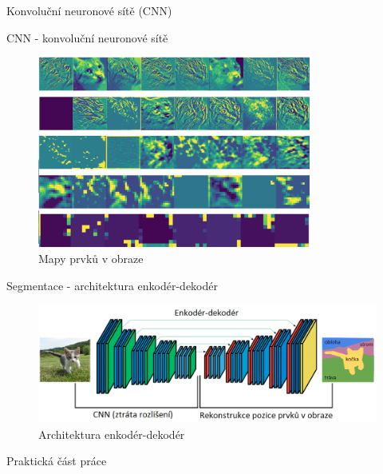 \documentclass[aspectratio=1610]{beamer}
\begin{document}
\begin{frame}{}
\centering
{\Large Konvoluční neuronové sítě (CNN)}	
\end{frame}
\begin{frame}{CNN - konvoluční neuronové sítě}
	\begin{figure}[h]
	\begin{center}
		\includegraphics[width=9cm, keepaspectratio]{maps.png}
	\end{center}
	\caption{Mapy prvků v obraze} 	
\end{figure}
\end{frame}
\begin{frame}{Segmentace - architektura enkodér-dekodér}
\begin{figure}[h]
	\begin{center}
		\includegraphics[width=15cm, keepaspectratio]{segnet.png}
	\end{center}
	\caption{Architektura enkodér-dekodér} 	
\end{figure}
\end{frame}
\begin{frame}{}
\centering
{\Large Praktická část práce}	
\end{frame}
\end{document}
